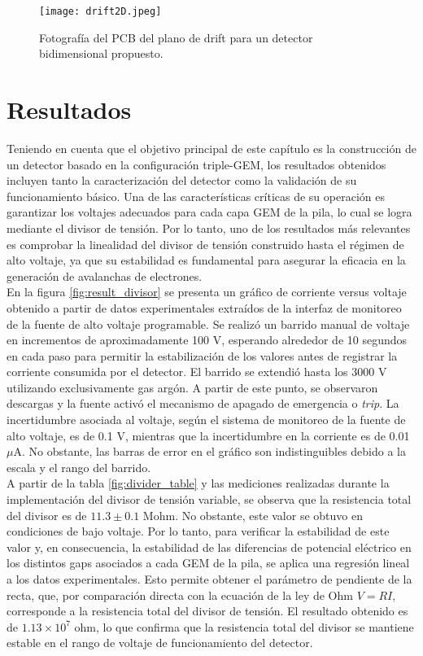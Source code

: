 \documentclass{report}
\begin{document}
\begin{figure}[H]
    \centering
    \texttt{[image: drift2D.jpeg]}
    \caption{Fotografía del PCB del plano de drift para un detector bidimensional propuesto.}
    \label{fig:drift_design}
\end{figure}

\newpage
\section{Resultados}

\noindent Teniendo en cuenta que el objetivo principal de este capítulo es la construcción de un detector basado en la configuración triple-GEM, los resultados obtenidos incluyen tanto la caracterización del detector como la validación de su funcionamiento básico. Una de las características críticas de su operación es garantizar los voltajes adecuados para cada capa GEM de la pila, lo cual se logra mediante el divisor de tensión. Por lo tanto, uno de los resultados más relevantes es comprobar la linealidad del divisor de tensión construido hasta el régimen de alto voltaje, ya que su estabilidad es fundamental para asegurar la eficacia en la generación de avalanchas de electrones.\\ 

\noindent En la figura \ref{fig:result_divisor} se presenta un gráfico de corriente versus voltaje obtenido a partir de datos experimentales extraídos de la interfaz de monitoreo de la fuente de alto voltaje programable. Se realizó un barrido manual de voltaje en incrementos de aproximadamente 100 V, esperando alrededor de 10 segundos en cada paso para permitir la estabilización de los valores antes de registrar la corriente consumida por el detector. El barrido se extendió hasta los 3000 V utilizando exclusivamente gas argón. A partir de este punto, se observaron descargas y la fuente activó el mecanismo de apagado de emergencia o \textit{trip}. La incertidumbre asociada al voltaje, según el sistema de monitoreo de la fuente de alto voltaje, es de 0.1 V, mientras que la incertidumbre en la corriente es de 0.01 $\mu$A. No obstante, las barras de error en el gráfico son indistinguibles debido a la escala y el rango del barrido.\\   

\noindent A partir de la tabla \ref{fig:divider_table} y las mediciones realizadas durante la implementación del divisor de tensión variable, se observa que la resistencia total del divisor es de $11.3 \pm 0.1$ Mohm. No obstante, este valor se obtuvo en condiciones de bajo voltaje. Por lo tanto, para verificar la estabilidad de este valor y, en consecuencia, la estabilidad de las diferencias de potencial eléctrico en los distintos gaps asociados a cada GEM de la pila, se aplica una regresión lineal a los datos experimentales. Esto permite obtener el parámetro de pendiente de la recta, que, por comparación directa con la ecuación de la ley de Ohm $V = RI$, corresponde a la resistencia total del divisor de tensión. El resultado obtenido es de $1.13 \times 10^{7}$ ohm, lo que confirma que la resistencia total del divisor se mantiene estable en el rango de voltaje de funcionamiento del detector.
\end{document}
